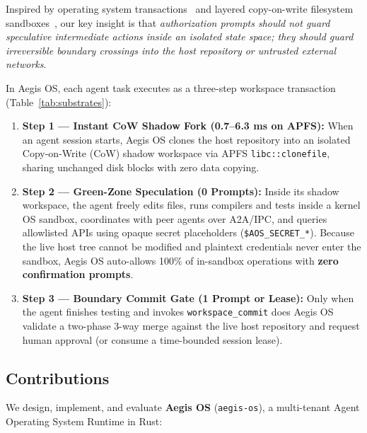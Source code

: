 \documentclass[acmsmall,screen,review]{acmart}
\begin{document}
Inspired by operating system transactions~\cite{porter2009txos,nightingale2005speculator} and layered copy-on-write filesystem sandboxes~\cite{kim2013mbox,wright2004unionfs}, our key insight is that \emph{authorization prompts should not guard speculative intermediate actions inside an isolated state space; they should guard irreversible boundary crossings into the host repository or untrusted external networks}.

In Aegis OS, each agent task executes as a three-step workspace transaction (Table~\ref{tab:substrates}):
\begin{enumerate}
    \item \textbf{Step 1 --- Instant CoW Shadow Fork (0.7--6.3 ms on APFS):} When an agent session starts, Aegis OS clones the host repository into an isolated Copy-on-Write (CoW) shadow workspace via APFS \texttt{libc::clonefile}, sharing unchanged disk blocks with zero data copying.
    \item \textbf{Step 2 --- Green-Zone Speculation (0 Prompts):} Inside its shadow workspace, the agent freely edits files, runs compilers and tests inside a kernel OS sandbox, coordinates with peer agents over A2A/IPC, and queries allowlisted APIs using opaque secret placeholders (\texttt{\$AOS\_SECRET\_*}). Because the live host tree cannot be modified and plaintext credentials never enter the sandbox, Aegis OS auto-allows 100\% of in-sandbox operations with \textbf{zero confirmation prompts}.
    \item \textbf{Step 3 --- Boundary Commit Gate (1 Prompt or Lease):} Only when the agent finishes testing and invokes \texttt{workspace\_commit} does Aegis OS validate a two-phase 3-way merge against the live host repository and request human approval (or consume a time-bounded session lease).
\end{enumerate}

\subsection{Contributions}

We design, implement, and evaluate \textbf{Aegis OS} (\texttt{aegis-os}), a multi-tenant Agent Operating System Runtime in Rust:
\end{document}
